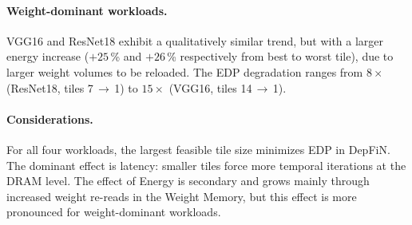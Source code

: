 \paragraph{Weight-dominant workloads.}
VGG16 and ResNet18 exhibit a qualitatively similar trend, but with a
larger energy increase ($+25$\,\% and $+26$\,\% respectively from best
to worst tile), due to larger weight volumes to be reloaded.
The EDP degradation ranges from $8\times$ (ResNet18, tiles 7\,$\to$\,1)
to $15\times$ (VGG16, tiles 14\,$\to$\,1).

\paragraph{Considerations.}

For all four workloads, the largest feasible tile size minimizes EDP in DepFiN.
The dominant effect is latency: smaller tiles force more temporal
iterations at the DRAM level.
The effect of Energy is secondary and grows mainly through increased weight re-reads in the Weight Memory, but this effect is more pronounced for
weight-dominant workloads.